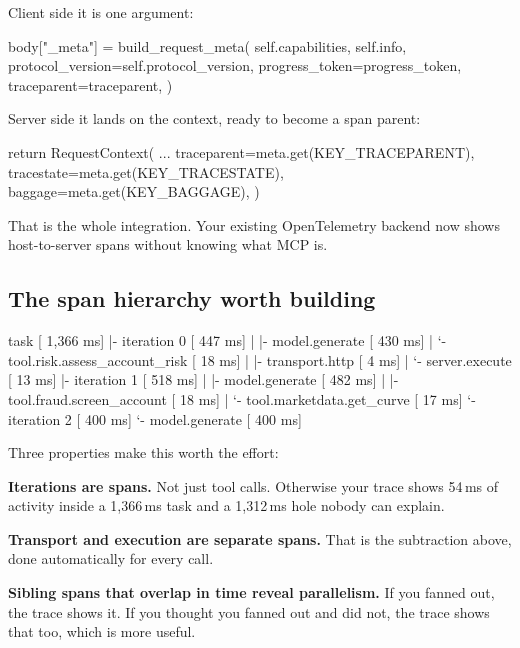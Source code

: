 Client side it is one argument:

\begin{py}
body["_meta"] = build_request_meta(
    self.capabilities, self.info,
    protocol_version=self.protocol_version,
    progress_token=progress_token,
    traceparent=traceparent,
)
\end{py}

Server side it lands on the context, ready to become a span parent:

\begin{py}
return RequestContext(
    ...
    traceparent=meta.get(KEY_TRACEPARENT),
    tracestate=meta.get(KEY_TRACESTATE),
    baggage=meta.get(KEY_BAGGAGE),
)
\end{py}

That is the whole integration. Your existing OpenTelemetry backend now shows
host-to-server spans without knowing what MCP is.

\subsection{The span hierarchy worth building}

\begin{plain}
task                                    [ 1,366 ms]
 |- iteration 0                         [   447 ms]
 |   |- model.generate                  [   430 ms]
 |   `- tool.risk.assess_account_risk   [    18 ms]
 |       |- transport.http              [     4 ms]
 |       `- server.execute              [    13 ms]
 |- iteration 1                         [   518 ms]
 |   |- model.generate                  [   482 ms]
 |   |- tool.fraud.screen_account       [    18 ms]
 |   `- tool.marketdata.get_curve       [    17 ms]
 `- iteration 2                         [   400 ms]
     `- model.generate                  [   400 ms]
\end{plain}

Three properties make this worth the effort:

\textbf{Iterations are spans.} Not just tool calls. Otherwise your trace shows
54\,ms of activity inside a 1,366\,ms task and a 1,312\,ms hole nobody can
explain.

\textbf{Transport and execution are separate spans.} That is the subtraction above, done automatically for every call.

\textbf{Sibling spans that overlap in time reveal parallelism.} If you fanned
out, the trace shows it. If you thought you fanned out and did not, the trace
shows that too, which is more useful.


